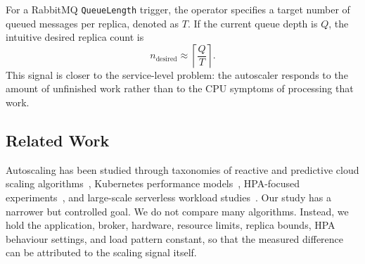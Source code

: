 For a RabbitMQ \texttt{QueueLength} trigger, the operator specifies a target number of queued messages per replica, denoted as $T$. If the current queue depth is $Q$, the intuitive desired replica count is
\begin{equation}
  \label{eq:keda}
  n_\mathrm{desired} \approx \left\lceil \frac{Q}{T} \right\rceil .
\end{equation}
This signal is closer to the service-level problem: the autoscaler responds to the amount of unfinished work rather than to the CPU symptoms of processing that work.

\subsection{Related Work}
\label{subsec:bg-related}
Autoscaling has been studied through taxonomies of reactive and predictive cloud scaling algorithms~\cite{qu2018taxonomy}, Kubernetes performance models~\cite{medel2016modelling}, HPA-focused experiments~\cite{nguyen2020hpa}, and large-scale serverless workload studies~\cite{shahrad2020serverless}. Our study has a narrower but controlled goal. We do not compare many algorithms. Instead, we hold the application, broker, hardware, resource limits, replica bounds, HPA behaviour settings, and load pattern constant, so that the measured difference can be attributed to the scaling signal itself.
